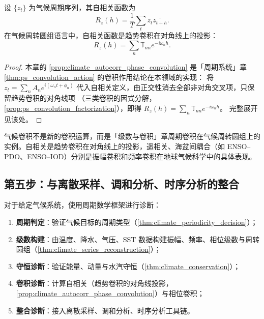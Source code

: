 \begin{proposition}[自相关与趋势卷积]\label{prop:climate_autocorr_phase_convolution}
设 $\{z_t\}$ 为气候周期序列，其自相关函数为
\[
R_z(h)=\frac1T\sum_t z_t\overline{z_{t+h}}.
\]
在气候周转圆组语言中，自相关函数是趋势卷积在对角线上的投影：
\[
R_z(h)=\sum_n\mathbb T_{nn}e^{-i\omega_n h}.
\]
\end{proposition}

\begin{proof}
本章的 \cref{prop:climate_autocorr_phase_convolution} 是「周期系统」章 \cref{thm:ps_convolution_action} 的卷积作用结论在本领域的实现：
将 $z_t=\sum_n A_n e^{i(\omega_n t+\phi_n)}$ 代入自相关定义，由正交性消去全部非对角交叉项，只保留趋势卷积的对角线项
（三类卷积的因式分解，\cref{prop:ps_convolution_factorization}），即得 $R_z(h)=\sum_n\mathbb T_{nn}e^{-i\omega_n h}$。
完整展开见该处。
\end{proof}

\begin{remark}[气候卷积与周期卷积的关系]\label{rem:climate_convolution_relation}
气候卷积不是新的卷积运算，而是「级数与卷积」章周期卷积在气候周转圆组上的实例。自相关是趋势卷积在对角线上的投影，遥相关、海盆间耦合（如 ENSO–PDO、ENSO–IOD）分别是振幅卷积和频率卷积在地球气候科学中的具体表现。
\end{remark}

\subsection{第五步：与离散采样、调和分析、时序分析的整合}

\begin{definition}[气候周期诊断流程]\label{def:climate_periodic_diagnosis}
对于给定气候系统，使用周期数学框架进行诊断：
\begin{enumerate}[label=(\roman*)]
    \item \textbf{周期判定}：验证气候目标的周期类型（\cref{thm:climate_periodicity_decision}）；
    \item \textbf{级数构建}：由温度、降水、气压、SST 数据构建振幅、频率、相位级数与周转圆组（\cref{thm:climate_series_reconstruction}）；
    \item \textbf{守恒诊断}：验证能量、动量与水汽守恒（\cref{thm:climate_conservation}）；
    \item \textbf{卷积诊断}：计算自相关（趋势卷积的对角线投影，\cref{prop:climate_autocorr_phase_convolution}）与相位卷积；
    \item \textbf{整合诊断}：接入离散采样、调和分析、时序分析工具链。
\end{enumerate}
\end{definition}

